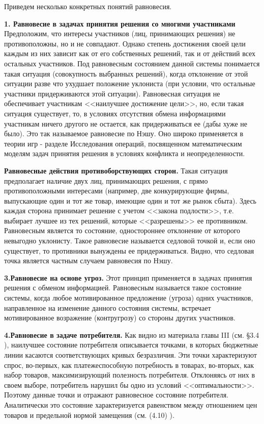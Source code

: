 \documentclass[12pt, 4paper]{book}
\begin{document}
{Приведем несколько конкретных понятий равновесия.
\par

\textbf{1. Равновесие в задачах принятия решения со многими участниками}
Предположим, что интересы участников (лиц, принимающих решения) не противоположны, но и не совпадают. Однако степень достижения своей цели каждым из них зависит как от его собственных решений, так и от действий всех остальных участников. Под равновесным состоянием данной системы понимается такая ситуация (совокупность выбранных решений), когда отклонение от этой ситуации разве что ухудшает положение уклониста (при условии, что остальные участники придерживаются этой ситуации). Равновесная ситуация не обеспечивает участникам <<наилучшее достижение цели>>, но, если такая ситуация существует, то, в условиях отсутствия обмена информациями участникам ничего другого не остается, как придерживаться ее (дабы хуже не было). Это так называемое равновесие по Нэшу. Оно широко применяется в теории игр - разделе Исследования операций, посвященном математическим моделям задач принятия решения в условиях конфликта и неопределенности.
\par

\textbf{Равновесные действия противоборствующих сторон.} Такая ситуация предполагает наличие двух лиц, принимающих решения, с прямо противоположными интересами (например, две конкурирующие фирмы, выпускающие один и тот же товар, имеющие один и тот же рынок сбыта). Здесь каждая сторона принимает решение с учетом <<закона подлости>>, т.е. выбирает лучшее из тех решений, которые <<разрешены>> ее противником. Равновесным является то состояние, одностороннее отклонение от которого невыгодно уклонисту. Такое равновесие называется седловой точкой и, если оно существует, то противники вынуждены ее придерживаться. Видно, что седловая точка является частным случаем равновесия по Нэшу.
\par

\textbf{3.Равновесие на основе угроз.} Этот принцип применяется в задачах принятия решения с обменом информацией. Равновесным называется такое состояние системы, когда любое мотивированное предложение (угроза) одних участников, направленное на изменение данного состояния системы, встречает мотивированное возражение (контругрозу) со стороны других участников.
\par

\textbf{4.Равновесие в задаче потребителя.} Как видно из материала главы III (см. §3.4 ), наилучшее состояние потребителя описывается точками, в которых бюджетные линии касаются соответствующих кривых безразличия. Эти точки характеризуют спрос, во-первых, как платежеспособную потребность в товарах, во-вторых, как набор товаров, максимизирующий полезность потребителя. Отклоняясь от них в своем выборе, потребитель нарушил бы одно из условий <<оптимальности>>. Поэтому данные точки и отражают равновесное состояние потребителя. Аналитически это состояние характеризуется равенством между отношением цен товаров и предельной нормой замещения (см. (4.10) ).
\par

}
\end{document}
